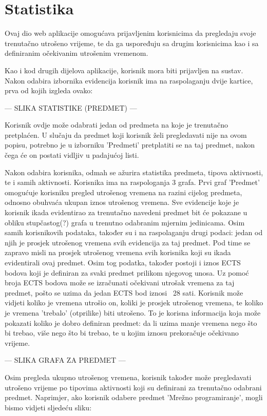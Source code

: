 \documentclass[times, utf8, zavrsni]{fer}
\begin{document}
\section{Statistika}
Ovaj dio web aplikacije omogućava prijavljenim korisnicima da pregledaju svoje trenutačno utrošeno vrijeme, te da ga uspoređuju sa drugim korisnicima kao i sa definiranim očekivanim utrošenim vremenom.

Kao i kod drugih dijelova aplikacije, korisnik mora biti prijavljen na sustav. Nakon odabira izbornika evidencija korisnik ima na raspolaganju dvije kartice, prva od kojih izgleda ovako:

--- SLIKA STATISTIKE (PREDMET) ---

Korisnik ovdje može odabrati jedan od predmeta na koje je trenutačno pretplaćen. U slučaju da predmet koji korisnik želi pregledavati nije na ovom popisu, potrebno je u izborniku 'Predmeti' pretplatiti se na taj predmet, nakon čega će on postati vidljiv u padajućoj listi.

Nakon odabira korisnika, odmah se ažurira statistika predmeta, tipova aktivnosti, te i samih aktivnosti. Korisnika ima na raspologanja 3 grafa. Prvi graf 'Predmet' omogućuje korisniku pregled utrošenog vremena na razini cijelog predmeta, odnosno obuhvaća ukupan iznos utrošenog vremena. Sve evidencije koje je korisnik ikada evidentirao za trenutačno navedeni predmet bit će pokazane u obliku stupčastog(?) grafa u trenutno odabranim mjernim jedinicama. Osim samih korisnikovih podataka, također su i na raspolaganju drugi podaci: jedan od njih je prosjek utrošenog vremena svih evidencija za taj predmet. Pod time se zapravo misli na prosjek utrošenog vremena svih korisnika koji su ikada evidentirali ovaj predmet. 
Osim tog podatka, također postoji i iznos ECTS bodova koji je definiran za svaki predmet prilikom njegovog unosa. Uz pomoć broja ECTS bodova može se izračunati očekivani utrošak vremena za taj predmet, pošto se uzima da jedan ECTS bod iznosi ~28 sati. Korisnik može vidjeti koliko je vremena utrošio on, koliki je prosjek utrošenog vremena, te koliko je vremena 'trebalo' (otprilike) biti utrošeno. To je korisna informacija koja može pokazati koliko je dobro definiran predmet: da li uzima manje vremena nego što bi trebao, više nego što bi trebao, te u kojim iznosu prekoračuje očekivano vrijeme.

--- SLIKA GRAFA ZA PREDMET ---

Osim pregleda ukupno utrošenog vremena, korisnik također može pregledavati utrošeno vrijeme po tipovima aktivnosti koji su definirani za trenutačno odabrani predmet. Naprimjer, ako korisnik odabere predmet 'Mrežno programiranje', mogli bismo vidjeti sljedeću sliku:
\end{document}
